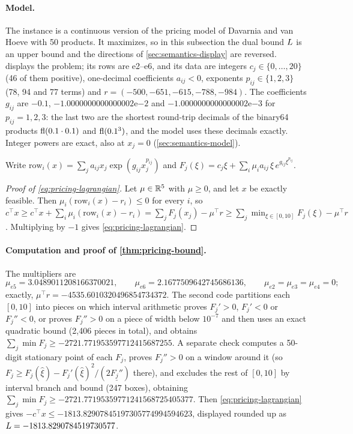 \paragraph{Model.}
The instance is a continuous version of the pricing model of Davarnia and van Hoeve with 50 products.
It maximizes, so in this subsection the dual bound $L$ is an upper bound and the directions of \cref{sec:semantics-display} are reversed.
 displays the problem; its rows are e2--e6, and its data are
integers $c_j\in\{0,\dots,20\}$ (46 of them positive), one-decimal coefficients $a_{ij}<0$, exponents $p_{ij}\in\{1,2,3\}$ (78, 94 and 77 terms) and
$r=(-500,-651,-615,-788,-984)$.
The coefficients $g_{ij}$ are $-0.1$, $-1.0000000000000002\mathrm{e}{-2}$ and $-1.0000000000000002\mathrm{e}{-3}$ for $p_{ij}=1,2,3$:
the last two are the shortest round-trip decimals of the binary64 products $\operatorname{fl}(0.1\cdot0.1)$ and $\operatorname{fl}(0.1^3)$, and the model uses these decimals exactly.
Integer powers are exact, also at $x_j=0$ (\cref{sec:semantics-model}).

Write $\mathrm{row}_i(x)=\sum_ja_{ij}x_j\exp(g_{ij}x_j^{p_{ij}})$ and
$F_j(\xi)=c_j\xi+\sum_i\mu_ia_{ij}\,\xi\,e^{g_{ij}\xi^{p_{ij}}}$.

\begin{proof}[Proof of \eqref{eq:pricing-lagrangian}]
Let $\mu\in\mathbb{R}^5$ with $\mu\ge0$, and let $x$ be exactly feasible.
Then $\mu_i(\mathrm{row}_i(x)-r_i)\le0$ for every $i$, so
$c^\top x\ge c^\top x+\sum_i\mu_i(\mathrm{row}_i(x)-r_i)=\sum_jF_j(x_j)-\mu^\top r\ge\sum_j\min_{\xi\in[0,10]}F_j(\xi)-\mu^\top r$.
Multiplying by $-1$ gives \eqref{eq:pricing-lagrangian}.
\end{proof}

\paragraph{Computation and proof of \cref{thm:pricing-bound}.}
The multipliers are
\[\mu_{e5}=3.0489011208166370021,\qquad\mu_{e6}=2.1677509642745686136,\qquad\mu_{e2}=\mu_{e3}=\mu_{e4}=0;\]
exactly, $\mu^\top r=-4535.6010320496854734372$.
The second code partitions each $[0,10]$ into pieces on which interval arithmetic proves $F_j'>0$, $F_j'<0$ or $F_j''<0$, or proves $F_j''>0$ on a piece of width below $10^{-7}$ and then uses an exact quadratic bound (2{,}406 pieces in total), and obtains $\sum_j\min F_j\ge-2721.771953597712415687255$.
A separate check computes a 50-digit stationary point of each $F_j$, proves $F_j''>0$ on a window around it (so $F_j\ge F_j(\hat\xi)-F_j'(\hat\xi)^2/(2\underline{F_j''})$ there), and excludes the rest of $[0,10]$ by interval branch and bound (247 boxes), obtaining $\sum_j\min F_j\ge-2721.77195359771241568725405377$.
Then \eqref{eq:pricing-lagrangian} gives $-c^\top x\le-1813.82907845197305774994594623$, displayed rounded up as $L=-1813.8290784519730577$.

